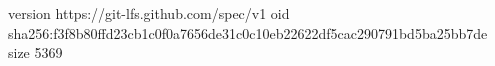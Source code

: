 version https://git-lfs.github.com/spec/v1
oid sha256:f3f8b80ffd23cb1c0f0a7656de31c0c10eb22622df5cac290791bd5ba25bb7de
size 5369

